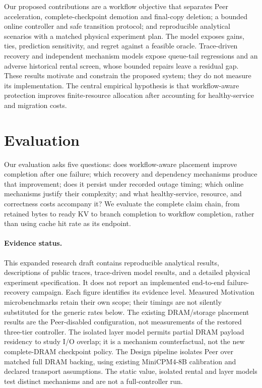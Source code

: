 \documentclass[sigplan,10pt,anonymous,nonacm]{acmart}
\begin{document}
Our proposed contributions are a workflow objective that separates Peer
acceleration, complete-checkpoint demotion and final-copy deletion; a bounded online controller and safe transition
protocol; and reproducible analytical scenarios with a matched physical
experiment plan. The model exposes gains, ties, prediction sensitivity,
and regret against a feasible oracle. Trace-driven recovery and independent
mechanism models expose queue-tail regressions and an adverse historical
rental screen, whose bounded repairs leave a residual gap. These results
motivate and constrain the proposed
system; they do not measure its implementation. The central empirical
hypothesis is that workflow-aware protection improves finite-resource
allocation after accounting for healthy-service and migration costs.




\section{Evaluation}
\label{sec:evaluation}

Our evaluation asks five questions: does workflow-aware placement improve
completion after one failure; which recovery and dependency mechanisms
produce that improvement; does it persist under recorded outage timing;
which online mechanisms justify their complexity; and what healthy-service,
resource, and correctness costs accompany it? We evaluate the complete
claim chain, from retained bytes to ready KV to branch completion to
workflow completion, rather than using cache hit rate as its endpoint.

\paragraph{Evidence status.}
This expanded research draft contains reproducible analytical results,
descriptions of public traces, trace-driven model results, and a detailed
physical experiment specification. It does not report an implemented
end-to-end failure-recovery campaign. Each figure identifies its evidence
level. Measured Motivation microbenchmarks retain their own scope;
their timings are not silently substituted for the generic rates below.
The existing DRAM/storage placement results are the Peer-disabled
configuration, not measurements of the restored three-tier controller.
The isolated layer model permits partial DRAM payload residency to study
I/O overlap; it is a mechanism counterfactual, not the new complete-DRAM
checkpoint policy. The Design pipeline isolates Peer over matched full DRAM backing,
using existing MiniCPM4-8B calibration and declared transport assumptions. The static value, isolated rental and
layer models test distinct mechanisms and are not a full-controller run.
\end{document}
